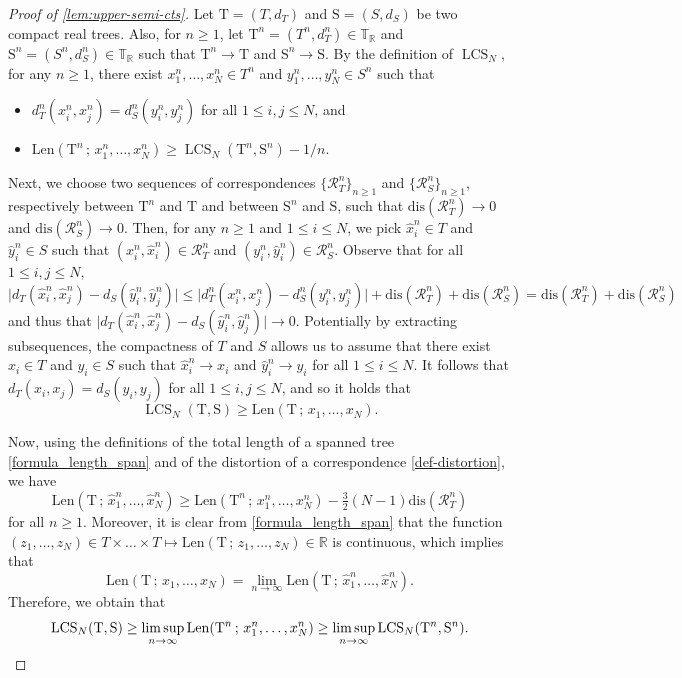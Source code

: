 \documentclass[11pt,reqno]{amsart}
\newcommand{\R}{\mathbb{R}}
\newcommand{\bbT}{\mathbb{T}}
\newcommand{\1}{\mathbf{1}}
\newcommand{\0}{\mathbf{0}}
\newcommand{\rT}{\mathrm{T}}
\newcommand{\rS}{\mathrm{S}}
\newcommand\cR{{\mathcal R}}
\newcommand{\LCS}{\operatorname{LCS}}
\begin{document}
\begin{proof}[Proof of \cref{lem:upper-semi-cts}]
Let $\rT=(T,d_T)$ and $\rS=(S,d_S)$ be two compact real trees. Also, for $n \geq 1$, let $\rT^n=(T^n,d_T^n)\in\bbT_\R$ and $\rS^n=(S^n,d_S^n)\in\bbT_\R$ such that $\rT^n\to\rT$ and $\rS^n\to\rS$. By the definition of $\LCS_N$, for any $n\geq 1$, there exist $x_1^n,\ldots,x_N^n\in T^n$ and $y_1^n,\ldots,y_N^n\in S^n$ such that
\begin{itemize}
    \item $d_T^n(x_i^n,x_j^n)=d_S^n(y_i^n,y_j^n)$ for all $1\leq i,j\leq N$, and
    \item $\mathrm{Len}(\rT^n\, ;\, x_1^n,\ldots,x_N^n)\geq \LCS_N(\rT^n,\rS^n)-1/n$.
\end{itemize}
Next, we choose two sequences of correspondences $\{ \cR_T^n\}_{n\geq 1}$ and $\{\cR_S^n\}_{n\geq 1}$, respectively between $\rT^n$ and $\rT$ and between $\rS^n$ and $\rS$, such that $\mathrm{dis}(\cR_T^n)\to 0$ and $\mathrm{dis}(\cR_S^n)\to 0$. Then, for any $n\geq 1$ and $1\leq i\leq N$, we pick $\hat{x}_i^n\in T$ and $\hat{y}_i^n\in S$ such that $(x_i^n,\hat{x}_i^n)\in\cR_T^n$ and $(y_i^n,\hat{y}_i^n)\in\cR_S^n$. Observe that for all $1\leq i,j\leq N$,
\[\big|d_T(\hat{x}_i^n,\hat{x}_j^n)-d_S(\hat{y}_i^n,\hat{y}_j^n)\big|\leq \big|d_T^n({x}_i^n,{x}_j^n)-d_S^n({y}_i^n,{y}_j^n)\big|+\mathrm{dis}(\cR_T^n)+\mathrm{dis}(\cR_S^n)=\mathrm{dis}(\cR_T^n)+\mathrm{dis}(\cR_S^n)\]
and thus that $\big|d_T(\hat{x}_i^n,\hat{x}_j^n)-d_S(\hat{y}_i^n,\hat{y}_j^n)\big|\to 0$. Potentially by extracting subsequences, the compactness of $T$ and $S$ allows us to assume that there exist $x_i\in T$ and $y_i\in S$ such that $\hat{x}_i^n\to x_i$ and $\hat{y}_i^n\to y_i$ for all $1\leq i\leq N$. It follows that $d_T(x_i,x_j)=d_S(y_i,y_j)$ for all $1\leq i,j\leq N$, and so it holds that
\[\LCS_N(\rT,\rS)\geq \mathrm{Len}(\rT\, ;\, x_1,\ldots,x_N).\]

Now, using the definitions of the total length of a spanned tree \eqref{formula_length_span} and of the distortion of a correspondence \eqref{def-distortion}, we have
\[\mathrm{Len}(\rT\, ;\, \hat{x}_1^n,\ldots,\hat{x}_N^n)\geq \mathrm{Len}(\rT^n\, ;\, x_1^n,\ldots,x_N^n)-\tfrac{3}{2}(N-1)\mathrm{dis}(\cR_T^n)\]
for all $n\geq 1$. Moreover, it is clear from \eqref{formula_length_span} that the function $(z_1,\ldots,z_N)\in T\times \ldots\times T\longmapsto \mathrm{Len}(\rT\, ;\, z_1,\ldots,z_N)\in \R$ is continuous, which implies that
\[\mathrm{Len}(\rT\, ;\, x_1,\ldots,x_N)=\lim_{n\to\infty}\mathrm{Len}(\rT\, ;\, \hat{x}_1^n,\ldots,\hat{x}_N^n).\]
Therefore, we obtain that
\[\LCS_N(\rT,\rS)\geq \limsup_{n\to\infty}\mathrm{Len}(\rT^n\, ;\, x_1^n,\ldots,x_N^n)\geq \limsup_{n\to\infty}\LCS_N(\rT^n,\rS^n).\qedhere\]
\end{proof}
\end{document}
